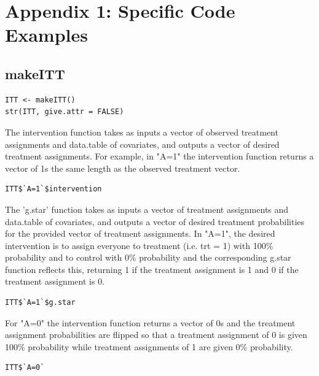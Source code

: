 \documentclass{report}
\newcommand{\1}{\ensuremath{\mathbf{1}}}
\begin{document}
\section{Appendix 1: Specific Code Examples}
\label{sec:org381052f}
\subsection{makeITT}
\label{sec:orgf3673ce}

\begin{lstlisting}
ITT <- makeITT()
str(ITT, give.attr = FALSE)
\end{lstlisting}

The intervention function takes as inputs a vector of observed treatment assignments and data.table of covariates, and outputs a vector of desired treatment assignments. For example, in "A=1" the intervention function returns a vector of 1s the same length as the observed treatment vector.

\begin{lstlisting}
ITT$`A=1`$intervention
\end{lstlisting}

The 'g.star' function takes as inputs a vector of treatment assignments and data.table of covariates, and outputs a vector of desired treatment probabilities for the provided vector of treatment assignments. In "A=1", the desired intervention is to assign everyone to treatment (i.e. trt = 1) with 100\% probability and to control with 0\% probability and the corresponding g.star function reflects this, returning 1 if the treatment assignment is 1 and 0 if the treatment assignment is 0.

\begin{lstlisting}
ITT$`A=1`$g.star
\end{lstlisting}

For "A=0" the intervention function returns a vector of 0s and the treatment assignment probabilities are flipped so that a treatment assignment of 0 is given 100\% probability while treatment assignments of 1 are given 0\% probability.

\begin{lstlisting}
ITT$`A=0`
\end{lstlisting}
\end{document}

